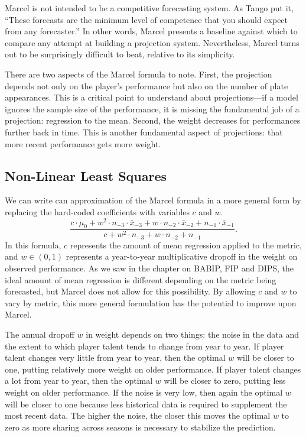 \documentclass{article}
\begin{document}
      Marcel is not intended to be a competitive forecasting system. As Tango put it, ``These forecasts are the minimum level of competence that you should expect from any forecaster.'' In other words, Marcel presents a baseline against which to compare any attempt at building a projection system. Nevertheless, Marcel turns out to be surprisingly difficult to beat, relative to its simplicity.
  
      There are two aspects of the Marcel formula to note. First, the projection depends not only on the player's performance but also on the number of plate appearances. This is a critical point to understand about projections---if a model ignores the sample size of the performance, it is missing the fundamental job of a projection: regression to the mean. Second, the weight decreases for performances further back in time. This is another fundamental aspect of projections: that more recent performance gets more weight.
  
    \subsection{\sc Non-Linear Least Squares}
  
      We can write can approximation of the Marcel formula in a more general form by replacing the hard-coded coefficients with variables $c$ and $w$.
      \begin{equation}
        \label{eqn:grid-search}
        \frac
          {c \cdot \mu_0 + w^2 \cdot n_{-3} \cdot \bar x_{-3} + w \cdot n_{-2} \cdot \bar x_{-2} + n_{-1} \cdot \bar x_{-1}}
          {c + w^2 \cdot n_{-3} + w \cdot n_{-2} + n_{-1}}.
      \end{equation}
      In this formula, $c$ represents the amount of mean regression applied to the metric, and $w \in (0, 1)$ represents a year-to-year multiplicative dropoff in the weight on observed performance. As we saw in the chapter on BABIP, FIP and DIPS, the ideal amount of mean regression is different depending on the metric being forecasted, but Marcel does not allow for this possibility. By allowing $c$ and $w$ to vary by metric, this more general formulation has the potential to improve upon Marcel.
  
      The annual dropoff $w$ in weight depends on two things: the noise in the data and the extent to which player talent tends to change from year to year. If player talent changes very little from year to year, then the optimal $w$ will be closer to one, putting relatively more weight on older performance. If player talent changes a lot from year to year, then the optimal $w$ will be closer to zero, putting less weight on older performance. If the noise is very low, then again the optimal $w$ will be closer to one because less historical data is required to supplement the most recent data. The higher the noise, the closer this moves the optimal $w$ to zero as more sharing across seasons is necessary to stabilize the prediction.
  
\end{document}

